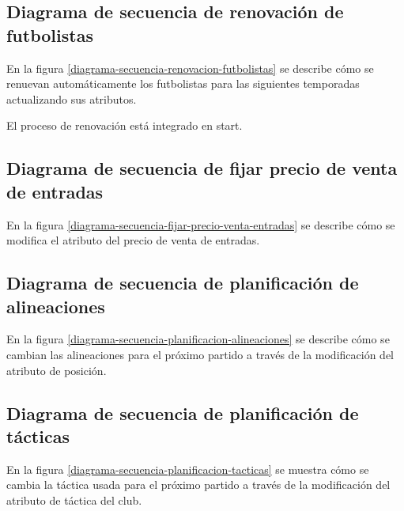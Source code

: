\newpage

\subsection*{Diagrama de secuencia de renovación de futbolistas}
En la figura \ref{diagrama-secuencia-renovacion-futbolistas} se describe cómo se
renuevan automáticamente los futbolistas para las siguientes temporadas
actualizando sus atributos.


El proceso de renovación está integrado en start.
\newpage

\subsection*{Diagrama de secuencia de fijar precio de venta de entradas}
En la figura \ref{diagrama-secuencia-fijar-precio-venta-entradas} se describe
cómo se modifica el atributo del precio de venta de entradas.


\subsection*{Diagrama de secuencia de planificación de alineaciones}
En la figura \ref{diagrama-secuencia-planificacion-alineaciones} se describe
cómo se cambian las alineaciones para el próximo partido a través de la
modificación del atributo de posición.


\subsection*{Diagrama de secuencia de planificación de tácticas}
En la figura \ref{diagrama-secuencia-planificacion-tacticas} se muestra cómo se
cambia la táctica usada para el próximo partido a través de la modificación del
atributo de táctica del club.

